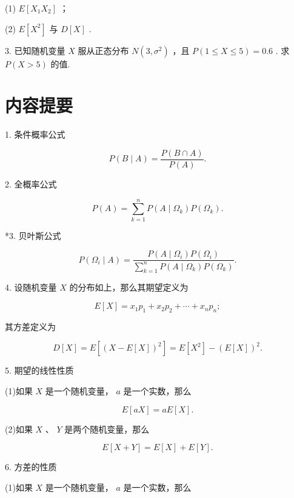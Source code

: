 \documentclass[10pt]{article}
\begin{document}
(1) \(E\left\lbrack  {{X}_{1}{X}_{2}}\right\rbrack\) ；

(2) \(E\left\lbrack  {X}^{2}\right\rbrack\) 与 \(D\left\lbrack  X\right\rbrack\) .

3. 已知随机变量 \(X\) 服从正态分布 \(N\left( {3,{\sigma }^{2}}\right)\) ，且 \(P\left( {1 \leq  X \leq  5}\right)  = {0.6}\) . 求 \(P\left( {X > 5}\right)\) 的值.

\section*{内容提要}

1. 条件概率公式

\[
P\left( {B \mid  A}\right)  = \frac{P\left( {B \cap  A}\right) }{P\left( A\right) }.
\]

2. 全概率公式

\[
P\left( A\right)  = \mathop{\sum }\limits_{{k = 1}}^{n}P\left( {A \mid  {\Omega }_{k}}\right) P\left( {\Omega }_{k}\right) .
\]

*3. 贝叶斯公式

\[
P\left( {{\Omega }_{i} \mid  A}\right)  = \frac{P\left( {A \mid  {\Omega }_{i}}\right) P\left( {\Omega }_{i}\right) }{\mathop{\sum }\limits_{{k = 1}}^{n}P\left( {A \mid  {\Omega }_{k}}\right) P\left( {\Omega }_{k}\right) }.
\]

4. 设随机变量 \(X\) 的分布如上，那么其期望定义为

\[
E\left\lbrack  X\right\rbrack   = {x}_{1}{p}_{1} + {x}_{2}{p}_{2} + \cdots  + {x}_{n}{p}_{n};
\]

其方差定义为

\[
D\left\lbrack  X\right\rbrack   = E\left\lbrack  {\left( X - E\left\lbrack  X\right\rbrack  \right) }^{2}\right\rbrack   = E\left\lbrack  {X}^{2}\right\rbrack   - {\left( E\left\lbrack  X\right\rbrack  \right) }^{2}.
\]

5. 期望的线性性质

(1)如果 \(X\) 是一个随机变量， \(a\) 是一个实数，那么

\[
E\left\lbrack  {aX}\right\rbrack   = {aE}\left\lbrack  X\right\rbrack  .
\]

(2)如果 \(X\) 、 \(Y\) 是两个随机变量，那么

\[
E\left\lbrack  {X + Y}\right\rbrack   = E\left\lbrack  X\right\rbrack   + E\left\lbrack  Y\right\rbrack  .
\]

6. 方差的性质

(1)如果 \(X\) 是一个随机变量， \(a\) 是一个实数，那么
\end{document}
